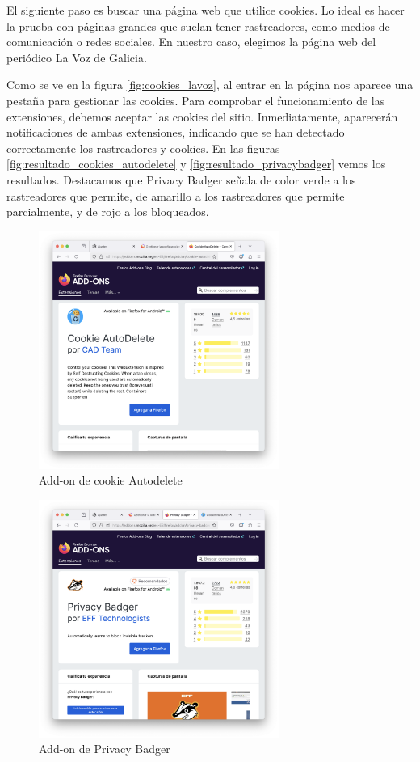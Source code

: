 El siguiente paso es buscar una página web que utilice cookies. Lo ideal es hacer la prueba con páginas grandes que suelan tener rastreadores, como medios de comunicación o redes sociales. En nuestro caso, elegimos la página web del periódico La Voz de Galicia.

Como se ve en la figura \ref{fig:cookies_lavoz}, al entrar en la página nos aparece una pestaña para gestionar las cookies. Para comprobar el funcionamiento de las extensiones, debemos aceptar las cookies del sitio. Inmediatamente, aparecerán notificaciones de ambas extensiones, indicando que se han detectado correctamente los rastreadores y cookies. En las figuras \ref{fig:resultado_cookies_autodelete} y \ref{fig:resultado_privacybadger} vemos los resultados. Destacamos que Privacy Badger señala de color verde a los rastreadores que permite, de amarillo a los rastreadores que permite parcialmente, y de rojo a los bloqueados. 

\begin{figure}[H]   
    \centering
    \includegraphics[width=0.7\textwidth]{addon_cookie_autodelete.png}
    \caption{Add-on de cookie Autodelete}
    \label{fig:addon_cookie_autodelete}
\end{figure}
\begin{figure}[H]   
    \centering
    \includegraphics[width=0.7\textwidth]{addon_privacybadger.png}
    \caption{Add-on de Privacy Badger}
    \label{fig:addon_privacybadger}
\end{figure}

